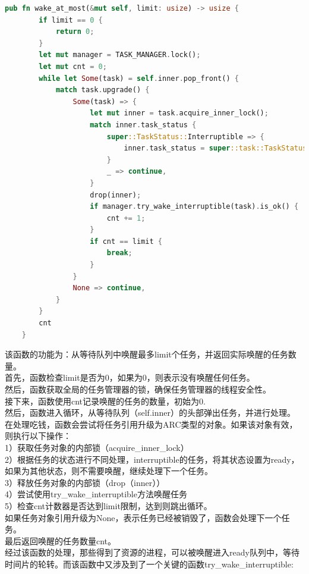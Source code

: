 \begin{lstlisting}[language=rust,caption={wake_at_most方法}]
    pub fn wake_at_most(&mut self, limit: usize) -> usize {
        if limit == 0 {
            return 0;
        }
        let mut manager = TASK_MANAGER.lock();
        let mut cnt = 0;
        while let Some(task) = self.inner.pop_front() {
            match task.upgrade() {
                Some(task) => {
                    let mut inner = task.acquire_inner_lock();
                    match inner.task_status {
                        super::TaskStatus::Interruptible => {
                            inner.task_status = super::task::TaskStatus::Ready
                        }
                        _ => continue,
                    }
                    drop(inner);
                    if manager.try_wake_interruptible(task).is_ok() {
                        cnt += 1;
                    }
                    if cnt == limit {
                        break;
                    }
                }
                None => continue,
            }
        }
        cnt
    }
\end{lstlisting}
该函数的功能为：从等待队列中唤醒最多limit个任务，并返回实际唤醒的任务数量。\\
首先，函数检查limit是否为0，如果为0，则表示没有唤醒任何任务。\\
然后，函数获取全局的任务管理器的锁，确保任务管理器的线程安全性。\\
接下来，函数使用cnt记录唤醒的任务的数量，初始为0.\\
然后，函数进入循环，从等待队列（self.inner）的头部弹出任务，并进行处理。\\
在处理吃钱，函数会尝试将任务引用升级为ARC类型的对象。如果该对象有效，则执行以下操作：\\
1）获取任务对象的内部锁（acquire_inner_lock）\\
2）根据任务的状态进行不同处理，interruptible的任务，将其状态设置为ready，如果为其他状态，则不需要唤醒，继续处理下一个任务。\\
3）释放任务对象的内部锁（drop（inner））\\
4）尝试使用try_wake_interruptible方法唤醒任务\\
5）检查cnt计数器是否达到limit限制，达到则跳出循环。\\
如果任务对象引用升级为None，表示任务已经被销毁了，函数会处理下一个任务。\\
最后返回唤醒的任务数量cnt。\\

经过该函数的处理，那些得到了资源的进程，可以被唤醒进入ready队列中，等待时间片的轮转。而该函数中又涉及到了一个关键的函数try_wake_interruptible:

